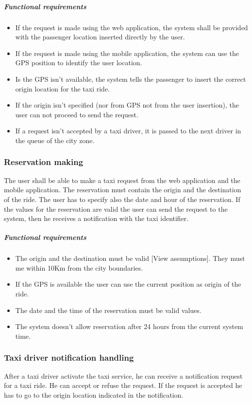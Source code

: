 	\subparagraph{Functional requirements}
	\noindent
		\begin{itemize}
			\item If the request is made using the web application, the system shall be provided with the passenger location inserted directly by the user.
			\item If the request is made using the mobile application, the system can use the GPS position to identify the user location.
			\item Is the GPS isn't available, the system tells the passenger to insert the correct origin location for the taxi ride.
			\item If the origin isn't specified (nor from GPS not from the user insertion), the user can not proceed to send the request.
			\item If a request isn't accepted by a taxi driver, it is passed to the next driver in the queue of the city zone.
		\end{itemize}


\subsubsection{Reservation making}
The user shall be able to make a taxi request from the web application and the mobile application. The reservation must contain the origin and the destination of the ride. The user has to specify also the date and hour of the reservation. If the values for the reservation are valid the user can send the request to the system, then he receives a notification with the taxi identifier.

	\subparagraph{Functional requirements}
	\noindent
		\begin{itemize}
			\item The origin and the destination must be valid [View assumptions]. They must me within 10Km from the city boundaries.
			\item If the GPS is available the user can use the current position as origin of the ride.
			\item The date and the time of the reservation must be valid values.
			\item The system doesn't allow reservation after 24 hours from the current system time.
		\end{itemize}


\subsubsection{Taxi driver notification handling}
After a taxi driver activate the taxi service, he can receive a notification request for a taxi ride. He can accept or refuse the request. If the request is accepted he has to go to the origin location indicated in the notification.

